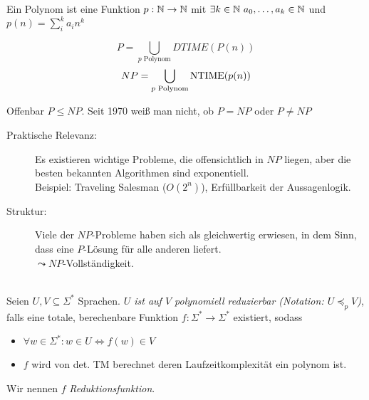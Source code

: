 {\begin{Def}[name={[Polynom]}]
	Ein Polynom ist eine Funktion $p:\N\->\N$ mit $\exists k\in \mathbb{N}\ a_0,\dots,a_k\in\mathbb{N}$ und \mbox{$p(n)=\sum_i^k a_in^k$}
\end{Def}
\begin{Def}
 \[ P = \bigcup_{p\text{ Polynom}} DTIME(P(n)) \]
 \[ NP = \bigcup_{p\text{ Polynom}} \operatorname{NTIME}(p(n)) \]
 
\end{Def}



Offenbar $P\leq NP$. Seit 1970 weiß man nicht, ob $P=NP$ oder $P\neq NP$
\begin{description}
\item[Praktische Relevanz:] Es existieren wichtige Probleme, die offensichtlich in $NP$ liegen, aber die besten bekannten Algorithmen sind exponentiell.\\
	Beispiel: Traveling Salesman ($O(2^n)$), Erfüllbarkeit der Aussagenlogik.
\item[Struktur:] Viele der $NP$-Probleme haben sich als gleichwertig erwiesen, in dem Sinn, dass eine $P$-Lösung für alle anderen liefert.\\
	$\leadsto NP$-Vollständigkeit.
\end{description}
}

\begin{Def}\label{def:PolyReduktion}\ \\
  Seien $U, V \subseteq \Sigma^*$ Sprachen.
  \emph{$U$ ist auf $V$ polynomiell reduzierbar (Notation: $U \preceq_p V$)}, falls eine totale, berechenbare Funktion
  $f:\Sigma^* \to \Sigma^*$ existiert, sodass
  \begin{itemize}
   \item $\forall w \in \Sigma^*:w \in U \iff f(w) \in V$
   \item $f$ wird von det. TM berechnet deren Laufzeitkomplexität ein polynom ist.
  \end{itemize}
  Wir nennen $f$ \emph{Reduktionsfunktion}.
\end{Def}

